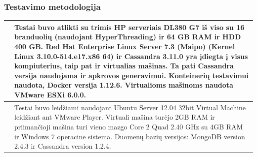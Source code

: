 \documentclass{VUMIFPSkursinis}
\begin{document}
\subsubsection{Testavimo metodologija}
\begin{center}
\begin{tabular}{ | m{5em} | m{10cm}| } 
\hline
\cite{BITCass}& Testai buvo atlikti su trimis HP serveriais DL380
G7 iš viso su 16 branduolių (naudojant HyperThreading) ir 64 GB RAM ir HDD 400
GB. Red Hat Enterprise Linux Server 7.3 (Maipo) (Kernel
Linux 3.10.0-514.e17.x86 64) ir Cassandra 3.11.0 yra įdiegta į visus kompiuterius, taip pat ir virtualias mašinas. Ta pati Cassandra versija naudojama ir apkrovos generavimui. 
Konteinerių testavimui naudota,
Docker versija 1.12.6. Virtualioms mašinoms naudota VMware ESXi 6.0.0.\\ 
\hline
\cite{BITCass}& Testai buvo leidžiami naudojant
Ubuntu Server 12.04 32bit Virtual Machine leidžiant ant VMware Player.
Virtuali mašina turėjo 2GB RAM ir priimančioji mašina turi vieno mazgo Core 2 Quad 2.40
GHz su 4GB RAM ir Windows 7 operacine sistema. Duomenų bazių versijos: MongoDB version 2.4.3
ir Cassandra version 1.2.4. \\ 
\hline
\end{tabular}
\end{center}
\end{document}

